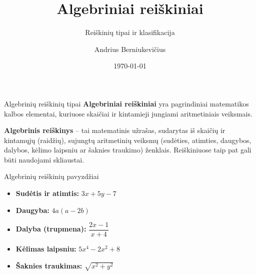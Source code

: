 \documentclass[aspectratio=169, 10pt]{beamer}
\title[Algebriniai reiškiniai]{Algebriniai reiškiniai}
\subtitle{Reiškinių tipai ir klasifikacija}
\author[A. Berniukevičius]{Andrius Berniukevičius}
\date{\today}
\newcommand{\vocab}[1]{\textbf{\color{structure.fg}#1}}
\begin{document}
\begin{frame}
    \titlepage
\end{frame}

\begin{frame}{Algebrinių reiškinių tipai}
    \vocab{Algebriniai reiškiniai} yra pagrindiniai matematikos kalbos elementai, kuriuose skaičiai ir kintamieji jungiami aritmetiniais veiksmais.
    
    \vspace{0.5cm}

    \begin{definition}
        \vocab{Algebrinis reiškinys} – tai matematinis užrašas, sudarytas iš skaičių ir kintamųjų (raidžių), sujungtų aritmetinių veiksmų (sudėties, atimties, daugybos, dalybos, kėlimo laipsniu ar šaknies traukimo) ženklais. Reiškiniuose taip pat gali būti naudojami skliaustai.
    \end{definition}
\end{frame}

\begin{frame}{Algebrinių reiškinių pavyzdžiai}
    \begin{example}
        \begin{itemize}
            \item \textbf{Sudėtis ir atimtis:} $3x + 5y - 7$
            \item \textbf{Daugyba:} $4a(a - 2b)$
            \item \textbf{Dalyba (trupmena):} $\dfrac{2x - 1}{x + 4}$
            \item \textbf{Kėlimas laipsniu:} $5x^4 - 2x^2 + 8$
            \item \textbf{Šaknies traukimas:} $\sqrt{x^2 + y^2}$
        \end{itemize}
    \end{example}
\end{frame}
\end{document}
